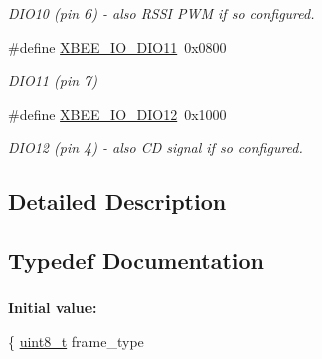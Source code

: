 \begin{DoxyCompactItemize}
\begin{DoxyCompactList}\small\item\em D\-I\-O10 (pin 6) -\/ also R\-S\-S\-I P\-W\-M if so configured. \end{DoxyCompactList}\item 
\hypertarget{group__xbee__io_ga7c1e80d3412af7f1218b981c5c4e3702}{\#define \hyperlink{group__xbee__io_ga7c1e80d3412af7f1218b981c5c4e3702}{X\-B\-E\-E\-\_\-\-I\-O\-\_\-\-D\-I\-O11}~0x0800}\label{group__xbee__io_ga7c1e80d3412af7f1218b981c5c4e3702}

\begin{DoxyCompactList}\small\item\em D\-I\-O11 (pin 7) \end{DoxyCompactList}\item 
\hypertarget{group__xbee__io_ga937549281953eb14d221e9f95445d210}{\#define \hyperlink{group__xbee__io_ga937549281953eb14d221e9f95445d210}{X\-B\-E\-E\-\_\-\-I\-O\-\_\-\-D\-I\-O12}~0x1000}\label{group__xbee__io_ga937549281953eb14d221e9f95445d210}

\begin{DoxyCompactList}\small\item\em D\-I\-O12 (pin 4) -\/ also C\-D signal if so configured. \end{DoxyCompactList}\end{DoxyCompactItemize}


\subsection{Detailed Description}


\subsection{Typedef Documentation}
\hypertarget{group__xbee__io_ga91bd181d244760611d0c5292f12bced8}{
\subsubsection[{xbee\-\_\-frame\-\_\-io\-\_\-response\-\_\-t}]{}}\label{group__xbee__io_ga91bd181d244760611d0c5292f12bced8}
{\bfseries Initial value\-:}
\begin{DoxyCode}
\{
   \hyperlink{group__hal_gae1affc9ca37cfb624959c866a73f83c2}{uint8\_t}          frame\_type
\end{DoxyCode}


